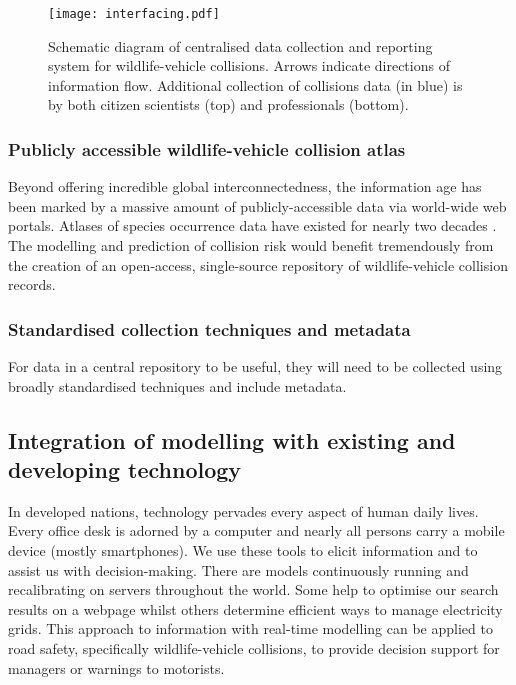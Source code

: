 \begin{figure*}[htp]
  \centering
  \texttt{[image: interfacing.pdf]}
  \caption[Centralised data collection and reporting system]{Schematic diagram of centralised data collection and reporting system for wildlife-vehicle collisions. Arrows indicate directions of information flow. Additional collection of collisions data (in blue) is by both citizen scientists (top) and professionals (bottom).}
  \label{wvc_server}
\end{figure*}

\subsubsection{Publicly accessible wildlife-vehicle collision atlas}

Beyond offering incredible global interconnectedness, the information age has been marked by a massive amount of publicly-accessible data via world-wide web portals. Atlases of species occurrence data have existed for nearly two decades \citep{}. The modelling and prediction of collision risk would benefit tremendously from the creation of an open-access, single-source repository of wildlife-vehicle collision records. 

\subsubsection{Standardised collection techniques and metadata}

For data in a central repository to be useful, they will need to be collected using broadly standardised techniques and include metadata.  

\subsection{Integration of modelling with existing and developing technology}

In developed nations, technology pervades every aspect of human daily lives. Every office desk is adorned by a computer and nearly all persons carry a mobile device (mostly smartphones). We use these tools to elicit information and to assist us with decision-making. There are models continuously running and recalibrating on servers throughout the world. Some help to optimise our search results on a webpage whilst others determine efficient ways to manage electricity grids. This approach to information with real-time modelling can be applied to road safety, specifically wildlife-vehicle collisions, to provide decision support for managers or warnings to motorists.

